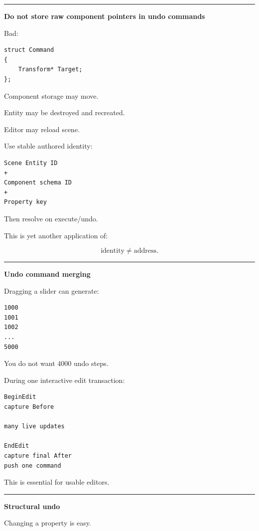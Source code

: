 \begin{center}\rule{0.5\linewidth}{0.5pt}\end{center}

\textbf{Do not store raw component pointers in undo commands}

Bad:

\begin{verbatim}
struct Command
{
    Transform* Target;
};
\end{verbatim}

Component storage may move.

Entity may be destroyed and recreated.

Editor may reload scene.

Use stable authored identity:

\begin{verbatim}
Scene Entity ID
+
Component schema ID
+
Property key
\end{verbatim}

Then resolve on execute/undo.

This is yet another application of:

\[
\text{identity}\neq\text{address}.
\]

\begin{center}\rule{0.5\linewidth}{0.5pt}\end{center}

\textbf{Undo command merging}

Dragging a slider can generate:

\begin{verbatim}
1000
1001
1002
...
5000
\end{verbatim}

You do not want 4000 undo steps.

During one interactive edit transaction:

\begin{verbatim}
BeginEdit
capture Before

many live updates

EndEdit
capture final After
push one command
\end{verbatim}

This is essential for usable editors.

\begin{center}\rule{0.5\linewidth}{0.5pt}\end{center}

\textbf{Structural undo}

Changing a property is easy.

